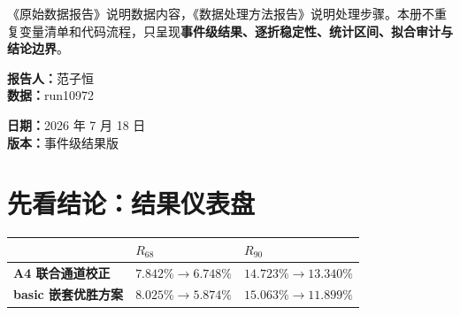 \documentclass[UTF8,11pt,a4paper,oneside,fontset=none]{ctexart}
\newcommand{\Rsixtyeight}{R_{68}}
\newcommand{\Rninty}{R_{90}}
\begin{document}
\vspace{0.32cm}
\begin{boundarybox}[title={与前两册的分工},fonttitle=\bfseries]
《原始数据报告》说明数据内容，《数据处理方法报告》说明处理步骤。本册不重复变量清单和代码流程，只呈现\textbf{事件级结果、逐折稳定性、统计区间、拟合审计与结论边界}。
\end{boundarybox}

\vfill
\noindent
\begin{minipage}[t]{0.48\textwidth}
\textbf{报告人：}范子恒\\
\textbf{数据：}run10972
\end{minipage}\hfill
\begin{minipage}[t]{0.48\textwidth}
\raggedleft
\textbf{日期：}2026 年 7 月 18 日\\
\textbf{版本：}事件级结果版
\end{minipage}

\vspace{0.32cm}
\noindent{\color{PandaTeal}\rule{\textwidth}{1.3pt}}
\clearpage

\section{先看结论：结果仪表盘}

\begin{resultbox}[title={两个核心结果},fonttitle=\bfseries]
\begin{center}
\begin{tabular}{C{5.0cm} C{4.2cm} C{4.2cm}}
\toprule
 & \(\Rsixtyeight\) & \(\Rninty\)\\
\midrule
\textbf{A4 联合通道校正} &
\(\mathbf{7.842\%\rightarrow6.748\%}\) &
\(\mathbf{14.723\%\rightarrow13.340\%}\)\\
\textbf{basic 嵌套优胜方案} &
\(\mathbf{8.025\%\rightarrow5.874\%}\) &
\(\mathbf{15.063\%\rightarrow11.899\%}\)\\
\bottomrule
\end{tabular}
\end{center}
\end{resultbox}
\end{document}
